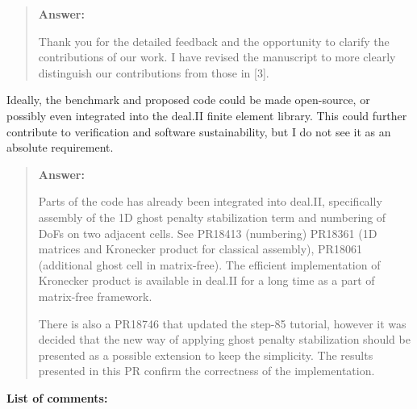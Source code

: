 \documentclass[11pt, a4paper]{article}
\newenvironment{answer}{%
      \begin{quote}%
            \color{blue!80!black}%
            \textbf{Answer:}%
            }{%
      \end{quote}%
}
\begin{document}
\begin{answer}
      Thank you for the detailed feedback and the opportunity to clarify the contributions of our work. I have revised
      the manuscript to more clearly distinguish our contributions from those in [3].
\end{answer}

Ideally, the benchmark and proposed code could be made open-source, or possibly even integrated into the deal.II finite
element library. This could further contribute to verification and software sustainability, but I do not see it as an
absolute requirement.
\begin{answer}
      Parts of the code has already been integrated into deal.II, specifically assembly of the 1D ghost penalty
      stabilization
      term and numbering of DoFs on two adjacent cells. See PR18413 (numbering)
      PR18361 (1D matrices and Kronecker product for classical assembly), PR18061 (additional ghost cell in
      matrix-free).
      The efficient implementation of Kronecker product is available in deal.II for a long time as a part of
      matrix-free framework.

      There is also a PR18746 that updated the step-85 tutorial, however it was decided that the new way of applying
      ghost penalty stabilization should be presented as a possible extension to keep the simplicity. The results
      presented in this PR confirm the correctness of the implementation.
\end{answer}

\bigskip
\noindent\textbf{List of comments:}
\end{document}

